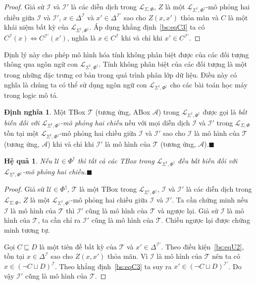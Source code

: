 \documentclass[12pt,a4paper,twoside]{report}
\newcommand{\mL}		{\mathcal{L}}
\newcommand{\mA}		{\mathcal{A}}
\newcommand{\mT}		{\mathcal{T}}
\newcommand{\mI}		{\mathcal{I}}
\newcommand{\mU}		{\mathcal{U}}
\newcommand{\PhiDag}	{\Phi^\dag}
\newcommand{\mLSP}		{\mL_{\Sigma,\Phi}}
\newcommand{\mLSPD}		{\mL_{\Sigma^\dag,\Phi^\dag}}
\newcommand{\myend}		{\mbox{}\hfill\mbox{{\scriptsize$\!\blacksquare$}}}
\newcommand{\mor}		{\sqcup}
\newtheorem{Corollary}{Hệ quả}[chapter]
\theoremstyle{definition}
\newtheorem{Definition}{Định nghĩa}[chapter]
\begin{document}
\begin{proof}
Giả sử $\mI$ và $\mI'$ là các diễn dịch trong $\mLSP$, $Z$ là một $\mLSPD$-mô phỏng hai chiều giữa $\mI$ và $\mI'$, $x \in \Delta^\mI$ và $x' \in \Delta^{\mI'}$ sao cho $Z(x, x')$ thỏa mãn và $C$ là một khái niệm bất kỳ của $\mLSPD$. Áp dụng khẳng định~\eqref{bs:eqC3} ta có $C^\mI(x) \Leftrightarrow C^{\mI'}(x')$, nghĩa là $x \in C^\mI$ khi và chỉ khi $x' \in C^{\mI'}$.
\end{proof}

Định lý này cho phép mô hình hóa tính không phân biệt được của các đối tượng thông qua ngôn ngữ con $\mLSPD$. Tính không phân biệt của các đối tượng là một trong những đặc trưng cơ bản trong quá trình phân lớp dữ liệu. Điều này có nghĩa là chúng ta có thể sử dụng ngôn ngữ con $\mLSPD$ cho các bài toán học máy trong logic mô tả.

\begin{Definition}
Một TBox $\mT$ (tương ứng, ABox $\mA$) trong $\mLSPD$ được gọi là {\em bất biến đối với $\mLSPD$-mô phỏng hai chiều} nếu với mọi diễn dịch $\mI$ và $\mI'$ trong $\mLSP$ tồn tại một $\mLSPD$-mô phỏng hai chiều giữa $\mI$ và $\mI'$ sao cho $\mI$ là mô hình của $\mT$ (tương ứng, $\mA$) khi và chỉ khi $\mI'$ là mô hình của $\mT$ (tương ứng, $\mA$).\myend
\end{Definition}

\begin{Corollary}
\label{co:Invariant}
Nếu $\mU \in \PhiDag$ thì tất cả các TBox trong $\mLSPD$ đều bất biến đối với $\mLSPD$-mô phỏng hai chiều.\myend
\end{Corollary}

\begin{proof}
Giả sử $\mU \in \PhiDag$, $\mT$ là một TBox trong $\mLSPD$, $\mI$ và $\mI'$ là các diễn dịch trong $\mLSP$, $Z$ là một $\mLSPD$-mô phỏng hai chiều giữa $\mI$ và $\mI'$. Ta cần chứng minh nếu $\mI$ là mô hình của $\mT$ thì $\mI'$ cũng là mô hình của $\mT$ và ngược lại. Giả sử $\mI$ là mô hình của $\mT$, ta cần chỉ ra $\mI'$ cũng là mô hình của $\mT$. Chiều ngược lại được chứng minh tương tự.

Gọi $C \sqsubseteq D$ là một tiên đề bất kỳ của $\mT$ và $x' \in \Delta^{\mI'}$. Theo điều kiện~\eqref{bs:eqU2}, tồn tại $x \in \Delta^\mI$ sao cho $Z(x, x')$ thỏa mãn. Vì $\mI$ là mô hình của $\mT$ nên ta có $x \in (\neg C \mor D)^\mI$. Theo khẳng định~\ref{bs:eqC3} ta suy ra $x' \in (\neg C \mor D)^{\mI'}$. Do vậy $\mI'$ cũng là mô hình của $\mT$.
\end{proof}
\end{document}
